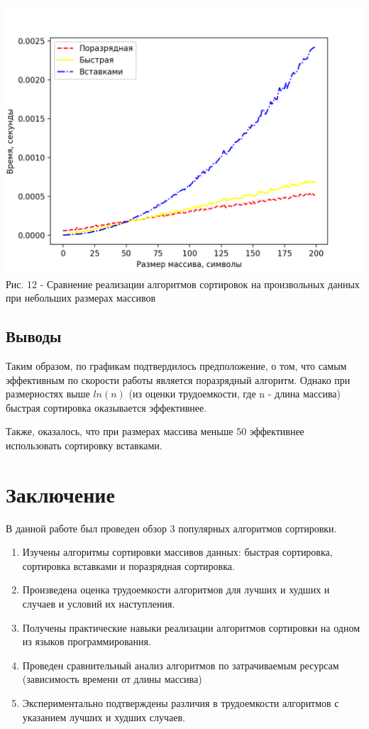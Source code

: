 \documentclass[a4paper,14pt]{article} %
\newcommand{\anonsection}[1]{\section*{#1}\addcontentsline{toc}{section}{#1}}
\begin{document}
	\begin{center}
        		\includegraphics[scale = 1]{graph7} \\ Рис. 12 - Сравнение реализации алгоритмов сортировок на произвольных данных при небольших размерах массивов
	\end{center}
	
		
	\subsection{Выводы}
	\hfill
	
	Таким образом, по графикам подтвердилось предположение, о том, что самым эффективным по скорости работы является поразрядный алгоритм. Однако при размерностях выше $ln(n)$ (из оценки трудоемкости, где n - длина массива) быстрая сортировка оказывается эффективнее. 
	
	Также, оказалось, что при размерах массива меньше 50 эффективнее использовать сортировку вставками. 
	
   	\newpage

        \anonsection{Заключение}
        
        \hfill
        
         В данной работе был проведен обзор 3 популярных алгоритмов сортировки. 
	\begin{enumerate}
		\item Изучены алгоритмы сортировки массивов данных: быстрая сортировка, сортировка вставками и поразрядная сортировка. 
		\item Произведена оценка трудоемкости алгоритмов для лучших и худших и случаев и условий их наступления. 
		\item Получены практические навыки реализации алгоритмов сортировки на одном из языков программирования. 
		\item Проведен сравнительный анализ алгоритмов по затрачиваемым ресурсам (зависимость времени от длины массива)
		\item Экспериментально подтверждены различия в трудоемкости алгоритмов с указанием лучших и худших случаев. 
	\end{enumerate}
	
\end{document}
